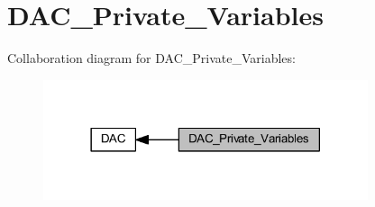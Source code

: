 \hypertarget{group___d_a_c___private___variables}{}\section{D\+A\+C\+\_\+\+Private\+\_\+\+Variables}
\label{group___d_a_c___private___variables}
Collaboration diagram for D\+A\+C\+\_\+\+Private\+\_\+\+Variables\+:
\nopagebreak
\begin{figure}[H]
\begin{center}
\leavevmode
\includegraphics[width=270pt]{group___d_a_c___private___variables}
\end{center}
\end{figure}
